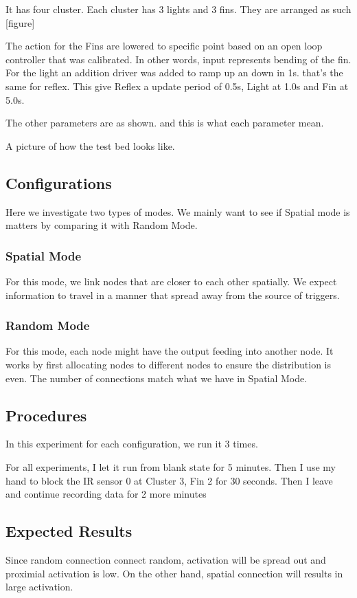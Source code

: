 It has four cluster. Each cluster has 3 lights and 3 fins. 
They are arranged as such [figure]

The action for the Fins are lowered to specific point based on an open loop controller that was calibrated. In other words, input represents bending of the fin. For the light an addition driver was added to ramp up an down in 1s. that's the same for reflex. This give Reflex a update period of 0.5s, Light at 1.0s and Fin at 5.0s. 

The other parameters are as shown. and this is what each parameter mean.

A picture of how the test bed looks like. 

\subsection{Configurations}

Here we investigate two types of modes. We mainly want to see if Spatial mode is matters by comparing it with Random Mode. 

\subsubsection{Spatial Mode}
For this mode, we link nodes that are closer to each other spatially. We expect information to travel in a manner that spread away from the source of triggers. 

\subsubsection{Random Mode}
For this mode, each node might have the output feeding into another node. It works by first allocating nodes to different nodes to ensure the distribution is even. The number of connections match what we have in Spatial Mode.

\subsection{Procedures}
In this experiment for each configuration, we run it 3 times. 

For all experiments, I let it run from blank state for 5 minutes. Then I use my hand to block the IR sensor 0 at Cluster 3, Fin 2 for 30 seconds. Then I leave and continue recording data for 2 more minutes


\subsection{Expected Results}
Since random connection connect random, activation will be spread out and proximial activation is low. On the other hand, spatial connection will results in large activation. 

